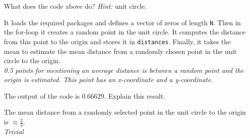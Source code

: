 \begin{exercise}[0.5]
What does the code above do? \textit{Hint:} unit circle.
\begin{solution}
It loads the required packages and defines a vector of zeros of length \texttt{N}. Then in the for-loop it creates a random point in the unit circle. It computes the distance from this point to the origin and stores it in \texttt{distances}. Finally, it takes the mean to estimate the mean distance from a randomly chosen point in the unit circle to the origin. \\
\textit{0.5 points for mentioning an average distance is between a random point and the origin is estimated. This point has an x-coordinate and a y-coordinate.}
\end{solution}
\end{exercise}
\begin{exercise}[0.5]
The output of the code is 0.66629. Explain this result.\begin{solution}
The mean distance from a randomly selected point in the unit circle to the origin is $\approx \frac{2}{3}$.\\
\textit{Trivial}
\end{solution}
\end{exercise}